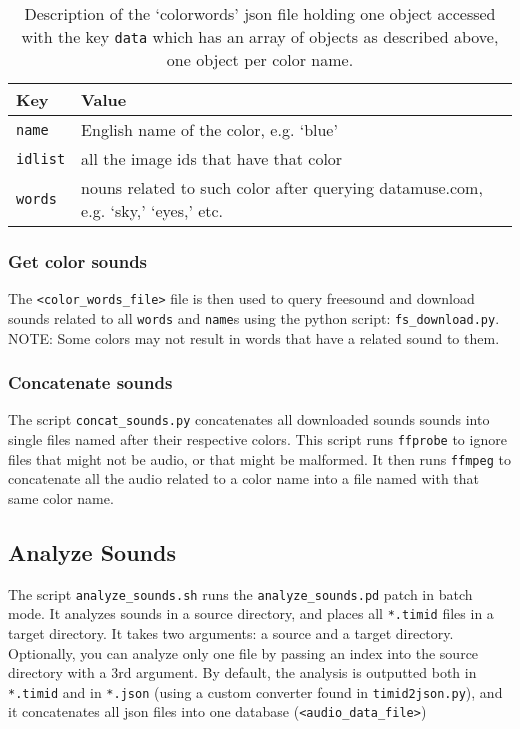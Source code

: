 \begin{table}
\begin{tabular}{l | l}

Key     & Value

\tabularnewline
\hline


\texttt{name}    & English name of the color, e.g. `blue'

\tabularnewline
\hline

\texttt{idlist}  & all the image ids that have that color

\tabularnewline
\hline

\texttt{words}   & nouns related to such color after querying datamuse.com, e.g. `sky,' `eyes,' etc. 

\end{tabular}
\label{tab:colorwords}
\caption{Description of the `colorwords' \gls{json} file holding one object accessed with the key \texttt{data} which has an array of objects as described above, one object per color name.}
\end{table}


\subsubsection{Get color sounds}

The \texttt{<color\_words\_file>} file is then used to query \gls{freesound} and download sounds related to all \texttt{words} and \texttt{name}s using the python script: \texttt{fs\_download.py}. NOTE: Some colors may not result in words that have a related sound to them.


\subsubsection{Concatenate sounds}

The script \texttt{concat\_sounds.py} concatenates all downloaded sounds sounds into single files named after their respective colors. This script runs \texttt{ffprobe} to ignore files that might not be audio, or that might be malformed. It then runs \texttt{ffmpeg} to concatenate all the audio related to a color name into a file named with that same color name.


\subsection{Analyze Sounds}



The script \texttt{analyze\_sounds.sh} runs the \texttt{analyze\_sounds.pd} patch in batch mode. It analyzes sounds in a source directory, and places all \texttt{*.timid} files in a target directory. It takes two arguments: a source and a target directory. Optionally, you can analyze only one file by passing an index into the source directory with a 3rd argument. By default, the analysis is outputted both in \texttt{*.timid} and in \texttt{*.json} (using a custom converter found in \texttt{timid2json.py}), and it concatenates all \gls{json} files into one database (\texttt{<audio\_data\_file>})


